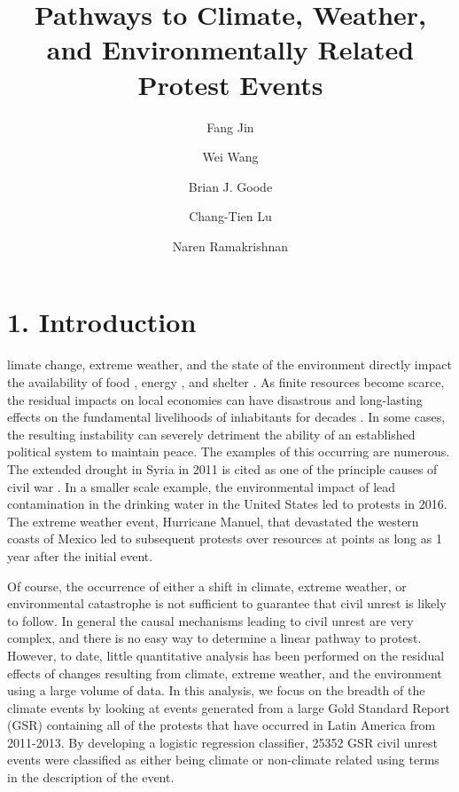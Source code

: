 \documentclass[9pt,twocolumn,twoside]{pnas-new}
\title{Pathways to Climate, Weather, and Environmentally Related Protest Events}
\author[a,1]{Fang Jin}
\author[a]{Wei Wang}
\author[a]{Brian J. Goode}
\author[a]{Chang-Tien Lu}
\author[a]{Naren Ramakrishnan}
\affil[a]{Discovery Analytics Center (Dept. of Computer Science), Virginia Tech - NCR, Arlington, VA 22203}
\begin{document}
\verticaladjustment{-2pt}

\maketitle
\thispagestyle{firststyle}
\section{1. Introduction}
limate change, extreme weather, and the state of the environment directly impact the availability of food \cite{RW3}, energy \cite{}, and shelter \cite{}.
As finite resources become scarce, the residual impacts on local economies can have disastrous and long-lasting effects on the fundamental livelihoods of inhabitants for decades \cite{}.
In some cases, the resulting instability can severely detriment the ability of an established political system to maintain peace.
The examples of this occurring are numerous.
The extended drought in Syria in 2011 is cited as one of the principle causes of civil war \cite{gleick2014water,kelley2015climate}.
In a smaller scale example, the environmental impact of lead contamination in the drinking water in the United States led to protests in 2016.
The extreme weather event, Hurricane Manuel, that devastated the western coasts of Mexico led to subsequent protests over resources at points as long as 1 year after the initial event.

Of course, the occurrence of either a shift in climate, extreme weather, or environmental catastrophe is not sufficient to guarantee that civil unrest is likely to follow.
In general the causal mechanisms leading to civil unrest are very complex, and there is no easy way to determine a linear pathway to protest.
However, to date, little quantitative analysis has been performed on the residual effects of changes resulting from climate, extreme weather, and the environment using a large volume of data.
In this analysis, we focus on the breadth of the climate events by looking at events generated from a large Gold Standard Report (GSR) containing all of the protests that have occurred in Latin America from 2011-2013.
By developing a logistic regression classifier, 25352 GSR civil unrest events were classified as either being climate or non-climate related using terms in the description of the event.
\end{document}
